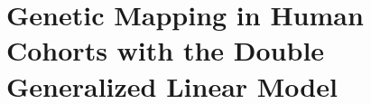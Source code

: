 \chapter{Genetic Mapping in Human Cohorts with the Double Generalized Linear Model}
\label{chap:dglm_human}

\lipsum[1]
